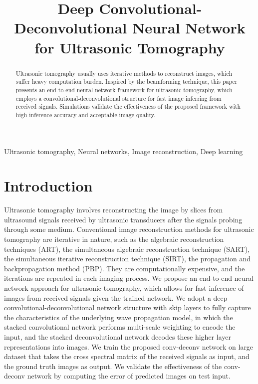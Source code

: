 \documentclass{article}
\title{Deep Convolutional-Deconvolutional Neural Network for Ultrasonic Tomography}
\begin{document}
%
\maketitle
%
\begin{abstract}

Ultrasonic tomography usually uses iterative methods to reconstruct images, which suffer heavy computation burden. Inspired by the beamforming technique, this paper presents an end-to-end neural network framework for ultrasonic tomography, which employs a convolutional-deconvolutional structure for fast image inferring from received signals. Simulations validate the effectiveness of the proposed framework with high inference accuracy and acceptable image quality.

\end{abstract}
%
\begin{keywords}

Ultrasonic tomography, Neural networks, Image reconstruction, Deep learning

\end{keywords}
%
\section{Introduction}
\label{sec:intro}

Ultrasonic tomography involves reconstructing the image by slices from ultrasound signals received by ultrasonic transducers after the signals probing through some medium. Conventional image reconstruction methods for ultrasonic tomography are iterative in nature, such as the algebraic reconstruction techniques (ART)\cite{gordon1974tutorial}, the simultaneous algebraic reconstruction technique (SART)\cite{andersen1984simultaneous}, the simultaneous iterative reconstruction technique (SIRT)\cite{trampert1990simultaneous}, the propagation and backpropagation method (PBP)\cite{dong2013mimo}. They are computationally expensive, and the iterations are repeated in each imaging process. We propose an end-to-end neural network approach for ultrasonic tomography, which allows for fast inference of images from received signals given the trained network. We adopt a deep convolutional-deconvolutional network structure with skip layers to fully capture the characteristics of the underlying wave propagation model, in which the stacked convolutional network performs multi-scale weighting to encode the input, and the stacked deconvolutional network decodes these higher layer representations into images. We train the proposed conv-deconv network on large dataset that takes the cross spectral matrix of the received signals as input, and the ground truth images as output. We validate the effectiveness of the conv-deconv network by computing the error of predicted images on test input.
\end{document}
